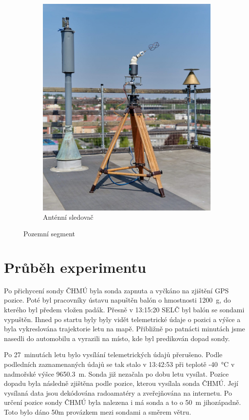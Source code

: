 \documentclass[twoside]{ctuthesis}
\theoremstyle{plain}
\theoremstyle{definition}
\theoremstyle{note}
\begin{document}
\begin{figure}[hbtp]
\begin{subfigure}{.49\textwidth}
			\includegraphics[height=1.2\textwidth]{Figures/tracker.jpg}
			\caption{Anténní sledovač}
			\label{fig:ground:tracker}
		\end{subfigure}
		\caption{Pozemní segment}
		\label{fig:ground}
	\end{figure}



	\section{Průběh experimentu}
	Po přichycení sondy ČHMÚ byla sonda zapnuta a vyčkáno na zjištění GPS pozice. Poté byl pracovníky ústavu napuštěn balón o hmostnosti 1200~g, do kterého byl předem vložen padák. Přesně v 13:15:20 SELČ byl balón se sondami vypuštěn. Ihned po startu byly byly vidět telemetrické údaje o pozici a výšce a byla vykreslována trajektorie letu na mapě. Přibližně po patnácti minutách jsme nasedli do automobilu a vyrazili na místo, kde byl predikován dopad sondy.

	Po 27~minutách letu bylo vysílání telemetrických údajů přerušeno. Podle podledních zaznamenaných údajů se tak stalo v 13:42:53 při teplotě -40~°C v nadmořské výšce 9650.3~m. Sonda již nezačala po dobu letu vysílat. Pozice dopadu byla následně zjištěna podle pozice, kterou vysílala sonda ČHMÚ. Její vysílaná data jsou dekódována radoamatéry a zveřejňována na internetu. Po určení pozice sondy ČHMÚ byla nalezena i má sonda a to o 50~m jihozápadně. Toto bylo dáno 50m provázkem mezi sondami a směrem větru.
\end{document}
